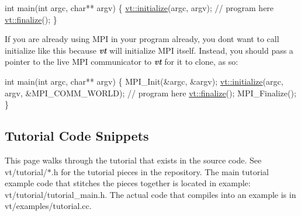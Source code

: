\begin{DoxyCode}
\textcolor{keywordtype}{int} main(\textcolor{keywordtype}{int} argc, \textcolor{keywordtype}{char}** argv) \{
  \hyperlink{namespacevt_aaa266774ea8339c58be0202b00fafa62}{vt::initialize}(argc, argv);
   \textcolor{comment}{// program here}
  \hyperlink{namespacevt_a540d90dbd6e97b69f1dcbc9ee9314cff}{vt::finalize}();
\}
\end{DoxyCode}


If you are already using M\+PI in your program already, you don\textquotesingle{}t want to call initialize like this because {\bfseries {\itshape vt}} will initialize M\+PI itself. Instead, you should pass a pointer to the live M\+PI communicator to {\bfseries {\itshape vt}} for it to clone, as so\+:


\begin{DoxyCode}
\textcolor{keywordtype}{int} main(\textcolor{keywordtype}{int} argc, \textcolor{keywordtype}{char}** argv) \{
  MPI\_Init(&argc, &argv);
  \hyperlink{namespacevt_aaa266774ea8339c58be0202b00fafa62}{vt::initialize}(argc, argv, &MPI\_COMM\_WORLD);
   \textcolor{comment}{// program here}
  \hyperlink{namespacevt_a540d90dbd6e97b69f1dcbc9ee9314cff}{vt::finalize}();
  MPI\_Finalize();
\}
\end{DoxyCode}
\hypertarget{tutorial_tutorial-walkthrough}{}\subsection{Tutorial Code Snippets}\label{tutorial_tutorial-walkthrough}
This page walks through the tutorial that exists in the source code. See {\ttfamily vt/tutorial/$\ast$.h} for the tutorial pieces in the repository. The main tutorial example code that stitches the pieces together is located in example\+: {\ttfamily vt/tutorial/tutorial\+\_\+main.\+h}. The actual code that compiles into an example is in {\ttfamily vt/examples/tutorial.\+cc}.


